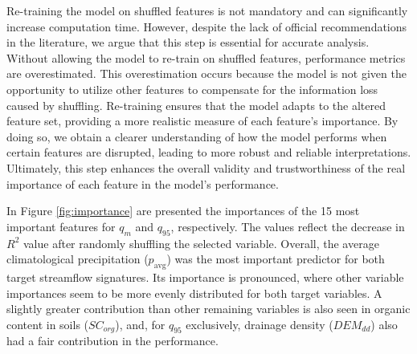 \documentclass[12pt]{article}
\begin{document}
\par Re-training the model on shuffled features is not mandatory and can significantly increase computation time. However, despite the lack of official recommendations in the literature, we argue that this step is essential for accurate analysis. Without allowing the model to re-train on shuffled features, performance metrics are overestimated. This overestimation occurs because the model is not given the opportunity to utilize other features to compensate for the information loss caused by shuffling. Re-training ensures that the model adapts to the altered feature set, providing a more realistic measure of each feature's importance. By doing so, we obtain a clearer understanding of how the model performs when certain features are disrupted, leading to more robust and reliable interpretations. Ultimately, this step enhances the overall validity and trustworthiness of the real importance of each feature in the model's performance.

\par In Figure \ref{fig:importance} are presented the importances of the 15 most important features for $q_{m}$ and $q_{95}$, respectively. The values reflect the decrease in $R^2$ value after randomly shuffling the selected variable. Overall, the average climatological precipitation ($p_{\text{avg}}$) was the most important predictor for both target streamflow signatures. Its importance is pronounced, where other variable importances seem to be more evenly distributed for both target variables. A slightly greater contribution than other remaining variables is also seen in organic content in soils ($SC_{org}$), and, for $q_{95}$ exclusively, drainage density ($DEM_{dd}$) also had a fair contribution in the performance.
\end{document}

